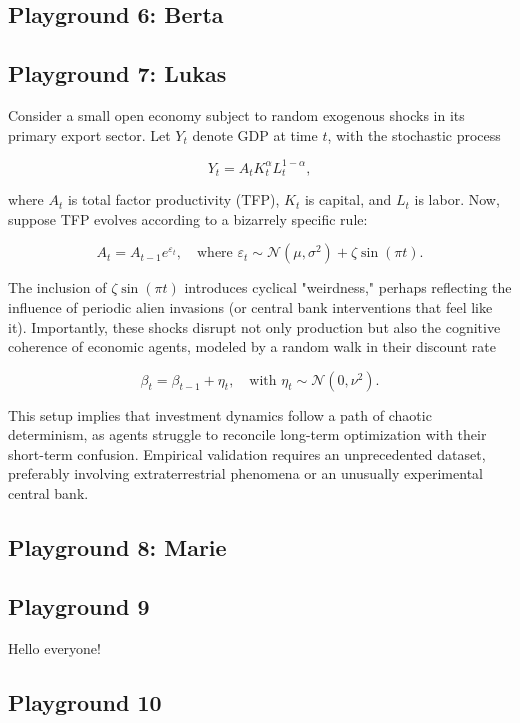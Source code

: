 \documentclass{article}
\begin{document}
\subsection{Playground 6: Berta}

\subsection{Playground 7: Lukas}
Consider a small open economy subject to random exogenous shocks in its primary export sector. Let \( Y_t \) denote GDP at time \( t \), with the stochastic process 

\[
Y_t = A_t K_t^\alpha L_t^{1-\alpha},
\]

where \( A_t \) is total factor productivity (TFP), \( K_t \) is capital, and \( L_t \) is labor. Now, suppose TFP evolves according to a bizarrely specific rule: 

\[
A_t = A_{t-1} e^{\varepsilon_t}, \quad \text{where } \varepsilon_t \sim \mathcal{N}(\mu, \sigma^2) + \zeta \sin(\pi t).
\]

The inclusion of \( \zeta \sin(\pi t) \) introduces cyclical "weirdness," perhaps reflecting the influence of periodic alien invasions (or central bank interventions that feel like it). Importantly, these shocks disrupt not only production but also the cognitive coherence of economic agents, modeled by a random walk in their discount rate 

\[
\beta_t = \beta_{t-1} + \eta_t, \quad \text{with } \eta_t \sim \mathcal{N}(0, \nu^2).
\]

This setup implies that investment dynamics follow a path of chaotic determinism, as agents struggle to reconcile long-term optimization with their short-term confusion. Empirical validation requires an unprecedented dataset, preferably involving extraterrestrial phenomena or an unusually experimental central bank.

\subsection{Playground 8: Marie}


\subsection{Playground 9}
Hello everyone!
\subsection{Playground 10}
\end{document}

